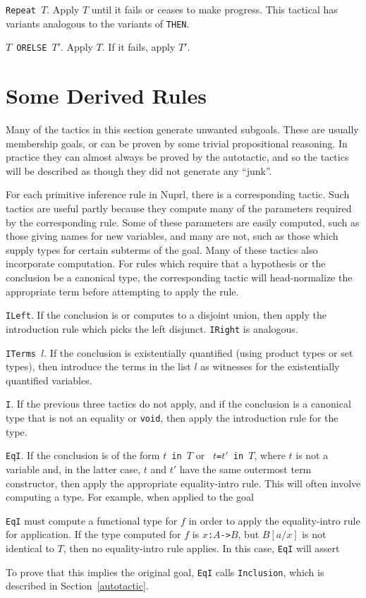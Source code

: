 {\tt Repeat $T$}.  Apply $T$ until it fails or ceases to make progress.  This
tactical has variants analogous to the variants of {\tt THEN}.

{\tt $T$ ORELSE $T'$}.  Apply $T$.  If it fails, apply $T'$.


\section{Some Derived Rules}

\label{derived}

Many of the tactics in this section generate unwanted subgoals.  These are
usually membership goals, or can be proven by some trivial propositional
reasoning.  In practice they can almost always be proved by the autotactic, and 
so the tactics will be described as though they did not generate any
``junk''. 

For each primitive inference rule in Nuprl, there is a corresponding tactic.
Such tactics are useful partly because they compute many of the parameters required
by the corresponding rule.  Some of these parameters are easily computed, 
such as those
giving names for new variables, and many are not, such as those which supply
types for certain subterms of the goal.   Many of these tactics also incorporate
computation. For rules which require that a hypothesis or the conclusion be a
canonical type, the corresponding tactic will head-normalize the appropriate
term before attempting to apply the rule. 

{\tt ILeft}.  If the conclusion is or computes to a disjoint union, then apply
the introduction rule which picks the left disjunct.  {\tt IRight} is analogous.

{\tt ITerms $l$}.  If the conclusion is existentially quantified (using product
types or set types), then introduce the terms in the list $l$ as witnesses for
the existentially quantified variables.

{\tt I}.  If the previous three tactics do not apply, and if the conclusion is a
canonical type that is not an equality or {\tt void}, then apply the
introduction rule for the type.

{\tt EqI}.  If the conclusion is of the form {\tt $t$~in~$T$} or {\tt
$t$=$t'$~in~$T$}, where $t$ is not a variable and, in the latter case, $t$ and
$t'$ have the same outermost term constructor, then apply the appropriate
equality-intro rule.  This will often involve computing a type.  For example,
when applied to the goal 
\begin{Numath}
\end{Numath}%
{\tt EqI} must compute a
functional type for $f$ in order to apply the equality-intro rule for
application.  If the type
computed for $f$ is {\tt $x$:$A$->$B$}, but $B[a/x]$ is not identical to $T$,
then no equality-intro rule applies.  In this case, {\tt EqI} will assert 
\begin{Numath}
\end{Numath}%
To prove that this implies the original goal, {\tt EqI} calls {\tt Inclusion},
which is described in Section~\ref{autotactic}.

